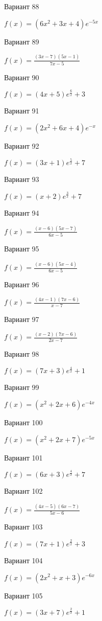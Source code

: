 \documentclass[11pt]{report}
\begin{document}
Вариант 88

$f(x) = \left(6 x^{2} + 3 x + 4\right) e^{- 5 x}$

Вариант 89

$f(x) = \frac{\left(3 x - 7\right) \left(5 x - 1\right)}{7 x - 5}$

Вариант 90

$f(x) = \left(4 x + 5\right) e^{\frac{6}{x}} + 3$

Вариант 91

$f(x) = \left(2 x^{2} + 6 x + 4\right) e^{- x}$

Вариант 92

$f(x) = \left(3 x + 1\right) e^{\frac{5}{x}} + 7$

Вариант 93

$f(x) = \left(x + 2\right) e^{\frac{3}{x}} + 7$

Вариант 94

$f(x) = \frac{\left(x - 6\right) \left(5 x - 7\right)}{6 x - 5}$

Вариант 95

$f(x) = \frac{\left(x - 6\right) \left(5 x - 4\right)}{6 x - 5}$

Вариант 96

$f(x) = \frac{\left(4 x - 1\right) \left(7 x - 6\right)}{x - 7}$

Вариант 97

$f(x) = \frac{\left(x - 2\right) \left(7 x - 6\right)}{2 x - 7}$

Вариант 98

$f(x) = \left(7 x + 3\right) e^{\frac{4}{x}} + 1$

Вариант 99

$f(x) = \left(x^{2} + 2 x + 6\right) e^{- 4 x}$

Вариант 100

$f(x) = \left(x^{2} + 2 x + 7\right) e^{- 5 x}$

Вариант 101

$f(x) = \left(6 x + 3\right) e^{\frac{4}{x}} + 7$

Вариант 102

$f(x) = \frac{\left(4 x - 5\right) \left(6 x - 7\right)}{5 x - 6}$

Вариант 103

$f(x) = \left(7 x + 1\right) e^{\frac{2}{x}} + 3$

Вариант 104

$f(x) = \left(2 x^{2} + x + 3\right) e^{- 6 x}$

Вариант 105

$f(x) = \left(3 x + 7\right) e^{\frac{2}{x}} + 1$
\end{document}
